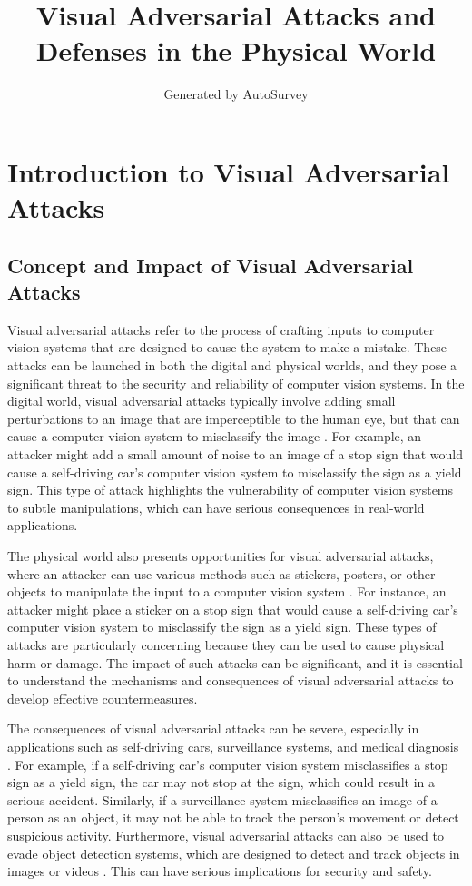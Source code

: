 \documentclass[11pt]{article}
\title{Visual Adversarial Attacks and Defenses in the Physical World}
\author{Generated by AutoSurvey}
\date{}
\begin{document}
\maketitle
\tableofcontents
\newpage

\section{Introduction to Visual Adversarial Attacks}

\subsection{Concept and Impact of Visual Adversarial Attacks}

Visual adversarial attacks refer to the process of crafting inputs to computer vision systems that are designed to cause the system to make a mistake. These attacks can be launched in both the digital and physical worlds, and they pose a significant threat to the security and reliability of computer vision systems. In the digital world, visual adversarial attacks typically involve adding small perturbations to an image that are imperceptible to the human eye, but that can cause a computer vision system to misclassify the image \cite{ref1}. For example, an attacker might add a small amount of noise to an image of a stop sign that would cause a self-driving car's computer vision system to misclassify the sign as a yield sign. This type of attack highlights the vulnerability of computer vision systems to subtle manipulations, which can have serious consequences in real-world applications.

The physical world also presents opportunities for visual adversarial attacks, where an attacker can use various methods such as stickers, posters, or other objects to manipulate the input to a computer vision system \cite{ref2}. For instance, an attacker might place a sticker on a stop sign that would cause a self-driving car's computer vision system to misclassify the sign as a yield sign. These types of attacks are particularly concerning because they can be used to cause physical harm or damage. The impact of such attacks can be significant, and it is essential to understand the mechanisms and consequences of visual adversarial attacks to develop effective countermeasures.

The consequences of visual adversarial attacks can be severe, especially in applications such as self-driving cars, surveillance systems, and medical diagnosis \cite{ref3}. For example, if a self-driving car's computer vision system misclassifies a stop sign as a yield sign, the car may not stop at the sign, which could result in a serious accident. Similarly, if a surveillance system misclassifies an image of a person as an object, it may not be able to track the person's movement or detect suspicious activity. Furthermore, visual adversarial attacks can also be used to evade object detection systems, which are designed to detect and track objects in images or videos \cite{ref4}. This can have serious implications for security and safety.
\end{document}

